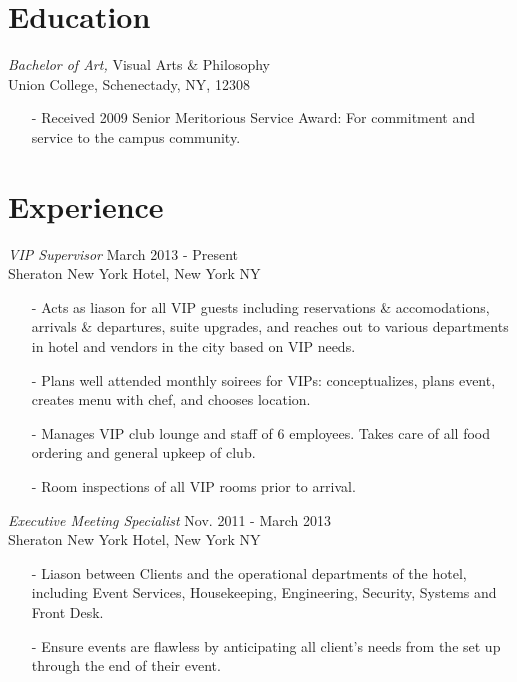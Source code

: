 \documentclass[margin, 10pt]{res} %
\begin{document}
\begin{resume}


\section{Education}

{\sl Bachelor of Art,} Visual Arts \& Philosophy \\
Union College, Schenectady, NY, 12308 \\
\vspace{-10pt}
\begin{itemize} \itemsep -2pt
\item[-] Received 2009 Senior Meritorious Service Award: For commitment and service to the campus community.
\end{itemize}
 
 
\section{Experience}

{\sl VIP Supervisor} \hfill March 2013 - Present \\
Sheraton New York Hotel, New York NY
\begin{itemize} \itemsep -2pt
\item[-] Acts as liason for all VIP guests including reservations \& accomodations, arrivals \& departures, suite upgrades, and reaches out to various departments in hotel and vendors in the city based on VIP needs.
\item[-] Plans well attended monthly soirees for VIPs: conceptualizes, plans event, creates menu with chef, and chooses location.
\item[-] Manages VIP club lounge and staff of 6 employees. Takes care of all food ordering and general upkeep of club.
\item[-] Room inspections of all VIP rooms prior to arrival.
\end{itemize}

{\sl Executive Meeting Specialist} \hfill Nov. 2011 - March 2013\\
Sheraton New York Hotel, New York NY
\begin{itemize} \itemsep -2pt
\item[-] Liason between Clients and the operational departments of the hotel, including Event Services, Housekeeping, Engineering, Security, Systems and Front Desk.
\item[-] Ensure events are flawless by anticipating all client's needs from the set up through the end of their event.
\end{itemize}


\end{resume}
\end{document}
